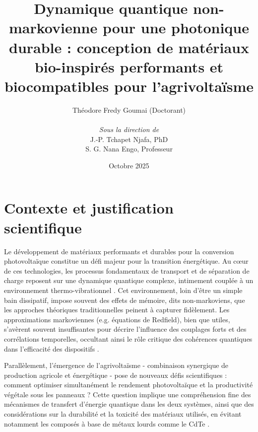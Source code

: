 \documentclass[12pt, a4paper]{article}
\title{\huge Dynamique quantique non-markovienne pour une photonique durable : conception de matériaux bio-inspirés performants et biocompatibles pour l'agrivoltaïsme}
\author{
    Théodore Fredy Goumai (Doctorant) \\
    \\
    \textit{Sous la direction de} \\
    J.-P. Tchapet Njafa, PhD \\
    S. G. Nana Engo, Professeur
}
\date{Octobre 2025}
\begin{document}
\maketitle
\thispagestyle{empty} %
\newpage

\tableofcontents %
\newpage
\setcounter{page}{1} %


\section{Contexte et justification scientifique}

Le développement de matériaux performants et durables pour la conversion photovoltaïque constitue un défi majeur pour la transition énergétique. Au cœur de ces technologies, les processus fondamentaux de transport et de séparation de charge reposent sur une dynamique quantique complexe, intimement couplée à un environnement thermo-vibrationnel \cite{ye2012, mohs2008}. Cet environnement, loin d'être un simple bain dissipatif, impose souvent des effets de mémoire, dits non-markoviens, que les approches théoriques traditionnelles peinent à capturer fidèlement. Les approximations markoviennes (e.g. équations de Redfield), bien que utiles, s'avèrent souvent insuffisantes pour décrire l'influence des couplages forts et des corrélations temporelles, occultant ainsi le rôle critique des cohérences quantiques dans l'efficacité des dispositifs \cite{tao2020, dijkstra2010, Worster2019}.

Parallèlement, l'émergence de l'agrivoltaïsme - combinaison synergique de production agricole et énergétique - pose de nouveaux défis scientifiques : comment optimiser simultanément le rendement photovoltaïque et la productivité végétale sous les panneaux ? Cette question implique une compréhension fine des mécanismes de transfert d'énergie quantique dans les deux systèmes, ainsi que des considérations sur la durabilité et la toxicité des matériaux utilisés, en évitant notamment les composés à base de métaux lourds comme le CdTe \cite{archet2018, leb2016}.
\end{document}
